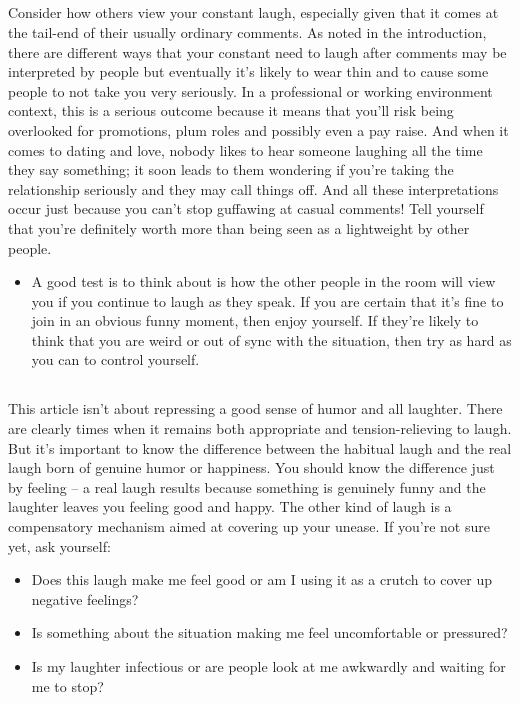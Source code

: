 \documentclass{article}
\begin{document}
\subsection{}
Consider how others view your constant laugh, especially given that it comes at the tail-end of their usually ordinary comments. As noted in the introduction, there are different ways that your constant need to laugh after comments may be interpreted by people but eventually it's likely to wear thin and to cause some people to not take you very seriously. In a professional or working environment context, this is a serious outcome because it means that you'll risk being overlooked for promotions, plum roles and possibly even a pay raise. And when it comes to dating and love, nobody likes to hear someone laughing all the time they say something; it soon leads to them wondering if you're taking the relationship seriously and they may call things off. And all these interpretations occur just because you can't stop guffawing at casual comments! Tell yourself that you're definitely worth more than being seen as a lightweight by other people.
\begin{itemize}
\item{A good test is to think about is how the other people in the room will view you if you continue to laugh as they speak. If you are certain that it's fine to join in an obvious funny moment, then enjoy yourself. If they're likely to think that you are weird or out of sync with the situation, then try as hard as you can to control yourself.}
\end{itemize}

\subsection{}
This article isn't about repressing a good sense of humor and all laughter. There are clearly times when it remains both appropriate and tension-relieving to laugh. But it's important to know the difference between the habitual laugh and the real laugh born of genuine humor or happiness. You should know the difference just by feeling – a real laugh results because something is genuinely funny and the laughter leaves you feeling good and happy. The other kind of laugh is a compensatory mechanism aimed at covering up your unease. If you're not sure yet, ask yourself:
\begin{itemize}
\item{Does this laugh make me feel good or am I using it as a crutch to cover up negative feelings?}
\item{Is something about the situation making me feel uncomfortable or pressured?}
\item{Is my laughter infectious or are people look at me awkwardly and waiting for me to stop?}
\end{itemize}
\end{document}
